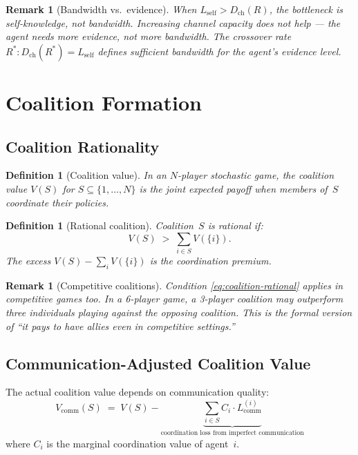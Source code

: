 \documentclass[11pt]{article}
\newtheorem{definition}[theorem]{Definition}
\newtheorem{remark}[theorem]{Remark}
\begin{document}
\begin{remark}[Bandwidth vs.\ evidence]
When $L_{\text{self}} > D_{\text{ch}}(R)$, the bottleneck is self-knowledge,
not bandwidth. Increasing channel capacity does not help --- the agent needs
more \emph{evidence}, not more bandwidth. The crossover rate
$R^* : D_{\text{ch}}(R^*) = L_{\text{self}}$ defines sufficient bandwidth
for the agent's evidence level.
\end{remark}


\section{Coalition Formation}

\subsection{Coalition Rationality}

\begin{definition}[Coalition value]
In an $N$-player stochastic game, the coalition value $V(S)$ for
$S \subseteq \{1,\ldots,N\}$ is the joint expected payoff when members
of~$S$ coordinate their policies.
\end{definition}

\begin{definition}[Rational coalition]
Coalition~$S$ is \emph{rational} if:
\begin{equation}\label{eq:coalition-rational}
  V(S) \;>\; \sum_{i \in S} V(\{i\}).
\end{equation}
The excess $V(S) - \sum_i V(\{i\})$ is the \emph{coordination premium}.
\end{definition}

\begin{remark}[Competitive coalitions]
Condition \eqref{eq:coalition-rational} applies in \emph{competitive}
games too. In a 6-player game, a 3-player coalition may outperform
three individuals playing against the opposing coalition. This is the
formal version of ``it pays to have allies even in competitive settings.''
\end{remark}

\subsection{Communication-Adjusted Coalition Value}

The actual coalition value depends on communication quality:
\begin{equation}
  V_{\text{comm}}(S) \;=\; V(S) - \underbrace{\sum_{i \in S} C_i \cdot L_{\text{comm}}^{(i)}}_{\text{coordination loss from imperfect communication}}
\end{equation}
where $C_i$ is the marginal coordination value of agent~$i$.
\end{document}
